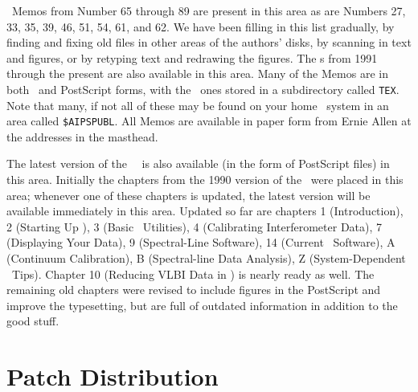 \AIPS\ Memos from Number 65 through 89 are present in this area as are
Numbers 27, 33, 35, 39, 46, 51, 54, 61, and 62.  We have been filling
in this list gradually, by finding and fixing old files in other areas
of the authors' disks, by scanning in text and figures, or by retyping
text and redrawing the figures.  The \Aipsletter s from 1991 through
the present are also available in this area.  Many of the Memos are in
both \TEX\ and PostScript forms, with the \TEX\ ones stored in a
subdirectory called \hbox{{\tt TEX}}.  Note that many, if not all of
these may be found on your home \AIPS\ system in an area called
\hbox{{\tt \$AIPSPUBL}}.  All Memos are available in paper form from
Ernie Allen at the addresses in the masthead.

The latest version of the \AIPS\ \Cookbook\ is also available (in the
form of PostScript files) in this area.  Initially the chapters from
the 1990 version of the \Cookbook\ were placed in this area;  whenever
one of these chapters is updated, the latest version will be available
immediately in this area.  Updated so far are chapters 1
(Introduction), 2 (Starting Up \AIPS), 3 (Basic \AIPS\ Utilities), 4
(Calibrating Interferometer Data), 7 (Displaying Your Data), 9
(Spectral-Line Software), 14 (Current \AIPS\ Software), A (Continuum
Calibration), B (Spectral-line Data Analysis), Z (System-Dependent
\AIPS\ Tips).  Chapter 10 (Reducing VLBI Data in \AIPS) is nearly
ready as well.  The remaining old chapters were revised to include
figures in the PostScript and improve the typesetting, but are full of
outdated information in addition to the good stuff.

\section{Patch Distribution}

